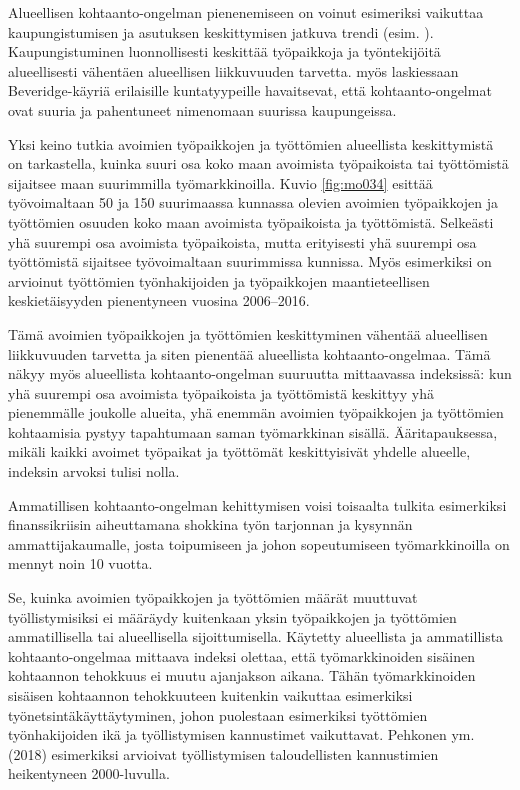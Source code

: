 \documentclass[12pt]{article}
\begin{document}
Alueellisen kohtaanto-ongelman pienenemiseen on voinut esimeriksi vaikuttaa kaupungistumisen ja asutuksen keskittymisen jatkuva trendi (esim. ). Kaupungistuminen luonnollisesti keskittää työpaikkoja ja työntekijöitä alueellisesti vähentäen alueellisen liikkuvuuden tarvetta.  myös laskiessaan Beveridge-käyriä erilaisille kuntatyypeille havaitsevat, että kohtaanto-ongelmat ovat suuria ja pahentuneet nimenomaan suurissa kaupungeissa. 

Yksi keino tutkia avoimien työpaikkojen ja työttömien alueellista keskittymistä on tarkastella, kuinka suuri osa koko maan avoimista työpaikoista tai työttömistä sijaitsee maan suurimmilla työmarkkinoilla. Kuvio \ref{fig:mo034} esittää työvoimaltaan 50 ja 150 suurimaassa kunnassa olevien avoimien työpaikkojen ja työttömien osuuden koko maan avoimista työpaikoista ja työttömistä. Selkeästi yhä suurempi osa avoimista työpaikoista, mutta erityisesti yhä suurempi osa työttömistä sijaitsee työvoimaltaan suurimmissa kunnissa. Myös esimerkiksi  on arvioinut työttömien työnhakijoiden ja työpaikkojen maantieteellisen keskietäisyyden pienentyneen vuosina 2006–2016. 

Tämä avoimien työpaikkojen ja työttömien keskittyminen vähentää alueellisen liikkuvuuden tarvetta ja siten pienentää alueellista kohtaanto-ongelmaa. Tämä näkyy myös alueellista kohtaanto-ongelman suuruutta mittaavassa indeksissä: kun yhä suurempi osa avoimista työpaikoista ja työttömistä keskittyy yhä pienemmälle joukolle alueita, yhä enemmän avoimien työpaikkojen ja työttömien kohtaamisia pystyy tapahtumaan saman työmarkkinan sisällä. Ääritapauksessa, mikäli kaikki avoimet työpaikat ja työttömät keskittyisivät yhdelle alueelle, indeksin arvoksi tulisi nolla. 

Ammatillisen kohtaanto-ongelman kehittymisen voisi toisaalta tulkita esimerkiksi finanssikriisin aiheuttamana shokkina työn tarjonnan ja kysynnän ammattijakaumalle, josta toipumiseen ja johon sopeutumiseen työmarkkinoilla on mennyt noin 10 vuotta.

Se, kuinka avoimien työpaikkojen ja työttömien määrät muuttuvat työllistymisiksi ei määräydy kuitenkaan yksin työpaikkojen ja työttömien ammatillisella tai alueellisella sijoittumisella. Käytetty alueellista ja ammatillista kohtaanto-ongelmaa mittaava indeksi olettaa, että työmarkkinoiden sisäinen kohtaannon tehokkuus ei muutu ajanjakson aikana. Tähän työmarkkinoiden sisäisen kohtaannon tehokkuuteen kuitenkin vaikuttaa esimerkiksi työnetsintäkäyttäytyminen, johon puolestaan esimerkiksi työttömien työnhakijoiden ikä ja työllistymisen kannustimet vaikuttavat. Pehkonen ym. (2018) esimerkiksi arvioivat työllistymisen taloudellisten kannustimien heikentyneen 2000-luvulla. 
\end{document}
